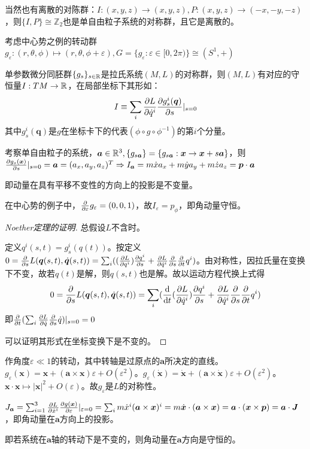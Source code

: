 \documentclass{ctexbook}
\begin{document}
当然也有离散的对陈群：$I:(x,y,z)\to (x,y,z), P:(x,y,z)\to (-x,-y,-z)$，则$\{I,P\}\cong\mathbb{Z}_{2}$也是单自由粒子系统的对称群，且它是离散的。

考虑中心势之例的转动群$g_{\varepsilon}:(r,\theta,\phi)\mapsto (r,\theta,\phi+\varepsilon), G=\{g_{\varepsilon}: \varepsilon\in [0,2\pi)\}\cong(S^{1},+)$

\begin{Thm}[Noether]
  单参数微分同胚群$\{g_{s}\}_{s\in\mathbb{R}}$是拉氏系统$(M,L)$的对称群，则$(M,L)$有对应的守恒量$I:TM\to\mathbb{R}$，在局部坐标下其形如：
  \[I\equiv \sum_{i}\frac{\partial L}{\partial \dot q^{i}}\frac{\partial g^{i}_{s}(\bm{q})}{\partial s}|_{s=0}\]
  其中$g^{i}_{s}(\bm q)$是$g$在坐标卡下的代表$(\phi\circ g\circ\phi^{-1})$的第$i$个分量。
\end{Thm}

\begin{Eg}
  考察单自由粒子的系统，$\bm{a}\in\mathbb{R}^{3},\{g_{s\bm{a}}\}=\{g_{s\bm a}:\bm{x}\to\bm{x}+s\bm{a}\}$，则$\frac{\partial g_{s}(\bm x)}{\partial s}|_{s=0}=\bm{a}=(a_{x},a_{y},a_{z})^{T}\Rightarrow I_{\bm a}=m\dot x a_{x}+m\dot y a_{y}+m\dot z a_{z}=\bm{p}\cdot\bm{a}$

  即动量在具有平移不变性的方向上的投影是不变量。
\end{Eg}

\begin{Eg}
  在中心势的例子中，$\frac{\partial }{\partial \varepsilon}g_{\varepsilon}=(0,0,1)$，故$I_{\varepsilon}=p_{\phi}$，即角动量守恒。
\end{Eg}

\begin{proof}[Noether定理的证明]
  总假设$L$不含时。

  定义$q^{i}(s,t)=g_{s}^{i}(q(t))$。按定义$0=\frac{\partial }{\partial s}L(\bm{q}(s,t),\dot{\bm{q}}(s,t))=\sum_{i}((\frac{\partial L}{\partial q^{i}})\frac{\partial q^{i}}{\partial s}+\frac{\partial L}{\partial \dot q^{i}}\frac{\partial }{\partial s}\frac{\partial }{\partial t}q^{i})$。由对称性，因拉氏量在变换下不变，故若$q(t)$是解，则$q(s,t)$也是解。故以运动方程代换上式得
  \[0=\frac{\partial }{\partial s}L(\bm{q}(s,t),\dot{\bm{q}}(s,t))=\sum_{i}(\frac{\mathrm{d}}{\mathrm{d}t}(\frac{\partial L}{\partial \dot q^{i}})\frac{\partial q^{i}}{\partial s}+\frac{\partial L}{\partial \dot q^{i}}\frac{\partial }{\partial s}\frac{\partial }{\partial t}q^{i})\]
  即$\frac{\partial }{\partial t}(\sum_{i}\frac{\partial L}{\partial \dot q}\frac{\partial }{\partial s}\dot q)|_{s=0}=0$

  可以证明其形式在坐标变换下是不变的。
\end{proof}

\begin{Eg}[直角坐标系下的中心势]
  作角度$\varepsilon\ll 1$的转动，其中转轴是过原点的$\bm{a}$所决定的直线。$g_{\varepsilon}(\bm{x})=\bm{x}+(\bm a\times \bm x)\varepsilon+O(\varepsilon^{2})$。$g_{\varepsilon}(\dot{\bm{x}})=\dot{\bm x}+(\bm a\times \bm{\dot x})\varepsilon+O(\varepsilon^{2})$。$\bm{x}\cdot\bm{x}\mapsto |\bm{x}|^{2}+O(\varepsilon)$。故$g_{\varepsilon}$是$L$的对称性。

  $J_{\bm a}=\sum_{i=1}^{3}\frac{\partial L}{\partial \dot x^{i}}\frac{\partial g(\bm{x})}{\partial \varepsilon}|_{\varepsilon=0}=\sum_{i}m\dot x^{i}(\bm a\times \bm x)^{i}=m\dot{\bm{x}}\cdot (\bm a\times \bm x)=\bm{a}\cdot (\bm x\times \bm{p})=\bm{a}\cdot \bm{J}$，即角动量在$\bm{a}$方向上的投影。

  即若系统在$\bm{a}$轴的转动下是不变的，则角动量在$\bm{a}$方向是守恒的。
\end{Eg}
\end{document}
